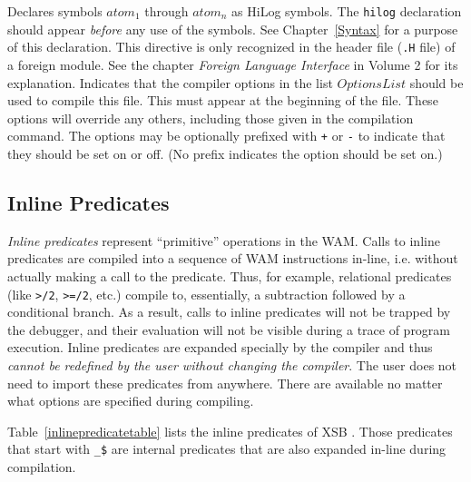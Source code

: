 \begin{description}
	Declares symbols $atom_1$ through $atom_n$ as HiLog symbols.
	The {\tt hilog} declaration should appear {\em before} any use of
	the symbols.  See Chapter~\ref{Syntax} for a purpose of this
 	declaration.
        This directive is only recognized in the header file ({\tt .H} file) 
	of a foreign module. See the chapter {\it Foreign Language
Interface} in Volume 2 for its explanation.
	Indicates that the compiler options in the list $OptionsList$
	should be used to compile this file.  This must appear at the
	beginning of the file.  These options will override any others,
	including those given in the compilation command.  The options
	may be optionally prefixed with \verb|+| or \verb|-| to
	indicate that they should be set on or off.  (No prefix
	indicates the option should be set on.)

\end{description}

\subsection{Inline Predicates}\label{inline_predicates}

{\em Inline predicates} represent ``primitive'' operations in the WAM.
Calls to inline predicates are compiled into a sequence of WAM
instructions in-line, i.e. without actually making a call to the
predicate.  Thus, for example, relational predicates (like {\tt >/2},
{\tt >=/2}, etc.) compile to, essentially, a subtraction followed by a
conditional branch.  As a result, calls to inline predicates will not
be trapped by the debugger, and their evaluation will not be visible
during a trace of program execution.  Inline predicates are expanded
specially by the compiler and thus {\em cannot be redefined by the
user without changing the compiler}.  The user does not need to import
these predicates from anywhere.  There are available no matter what
options are specified during compiling.

Table~\ref{inlinepredicatetable} lists the inline predicates of
XSB \version.  Those predicates that start with \verb|_$|
are internal predicates that are also expanded in-line during
compilation.

\begin{table}[htbp]
\caption{The Inline Predicates of XSB}\label{inlinepredicatetable}
\end{table}

